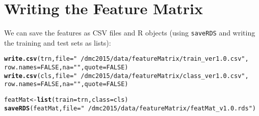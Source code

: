 \documentclass[10pt]{report}
\makeatletter
\newcommand{\hlnum}[1]{\textcolor[rgb]{0.686,0.059,0.569}{#1}}%
\newcommand{\hlstr}[1]{\textcolor[rgb]{0.192,0.494,0.8}{#1}}%
\newcommand{\hlstd}[1]{\textcolor[rgb]{0.345,0.345,0.345}{#1}}%
\newcommand{\hlkwb}[1]{\textcolor[rgb]{0.69,0.353,0.396}{#1}}%
\newcommand{\hlkwc}[1]{\textcolor[rgb]{0.333,0.667,0.333}{#1}}%
\newcommand{\hlkwd}[1]{\textcolor[rgb]{0.737,0.353,0.396}{\textbf{#1}}}%
\newenvironment{kframe}{%
 \def\at@end@of@kframe{}%
 \ifinner\ifhmode%
  \def\at@end@of@kframe{\end{minipage}}%
  \begin{minipage}{\columnwidth}%
 \fi\fi%
 \def\FrameCommand##1{\hskip\@totalleftmargin \hskip-\fboxsep
 \colorbox{shadecolor}{##1}\hskip-\fboxsep
     \hskip-\linewidth \hskip-\@totalleftmargin \hskip\columnwidth}%
 \MakeFramed {\advance\hsize-\width
   \@totalleftmargin\z@ \linewidth\hsize
   \@setminipage}}%
 {\par\unskip\endMakeFramed%
 \at@end@of@kframe}
\newenvironment{knitrout}{}{} %
\makeatother
\begin{document}
\section{Writing the Feature Matrix}
We can save the features as CSV files and R objects (using \verb!saveRDS! and writing the training and test sets as lists):
\begin{knitrout}
\color{fgcolor}\begin{kframe}
\begin{alltt}
\hlkwd{write.csv}\hlstd{(trn,} \hlkwc{file} \hlstd{=} \hlstr{"~/dmc2015/data/featureMatrix/train_ver1.0.csv"}\hlstd{,}
    \hlkwc{row.names} \hlstd{=} \hlnum{FALSE}\hlstd{,} \hlkwc{na} \hlstd{=} \hlstr{""}\hlstd{,} \hlkwc{quote} \hlstd{=} \hlnum{FALSE}\hlstd{)}
\hlkwd{write.csv}\hlstd{(cls,} \hlkwc{file} \hlstd{=} \hlstr{"~/dmc2015/data/featureMatrix/class_ver1.0.csv"}\hlstd{,}
    \hlkwc{row.names} \hlstd{=} \hlnum{FALSE}\hlstd{,} \hlkwc{na} \hlstd{=} \hlstr{""}\hlstd{,} \hlkwc{quote} \hlstd{=} \hlnum{FALSE}\hlstd{)}

\hlstd{featMat} \hlkwb{<-} \hlkwd{list}\hlstd{(}\hlkwc{train} \hlstd{= trn,} \hlkwc{class} \hlstd{= cls)}
\hlkwd{saveRDS}\hlstd{(featMat,} \hlkwc{file} \hlstd{=} \hlstr{"~/dmc2015/data/featureMatrix/featMat_v1.0.rds"}\hlstd{)}
\end{alltt}
\end{kframe}
\end{knitrout}
\end{document}
